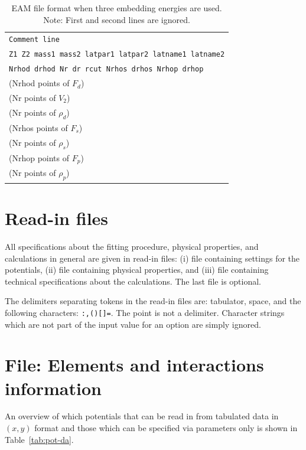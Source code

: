 \documentclass[a4paper,12pt,pdftex,onecolumn]{article}
\begin{document}
\begin{table}[!h]
\caption{
EAM file format when three embedding energies are used.
Note: First and second lines are ignored.
\label{tab:kw-eam-ff3}
}
\begin{center}
\begin{tabular}{|l|}
\hline
\hline
\verb+Comment line+ \\
\verb+Z1 Z2 mass1 mass2 latpar1 latpar2 latname1 latname2+ \\
\verb+Nrhod drhod Nr dr rcut Nrhos drhos Nrhop drhop+ \\
(Nrhod points of $F_d$) \\
(Nr points of $V_2$) \\
(Nr points of $\rho_d$) \\
(Nrhos points of $F_s$) \\
(Nr points of $\rho_s$) \\
(Nrhop points of $F_p$) \\
(Nr points of $\rho_p$) \\
\hline
\hline
\end{tabular}
\end{center}
\end{table}








\section{Read-in files}


All specifications about the fitting procedure, physical properties,
and calculations in general are given in read-in files:
(i) file containing settings for the potentials,
(ii) file containing physical properties, and
(iii) file containing technical specifications about the
calculations. The last file is optional.

The delimiters separating tokens in the read-in files are:
tabulator, space, and the following characters: \verb+:,()[]=+. The
point is not a delimiter. Character strings which are not part of the
input value for an option are simply ignored.





\section{File: Elements and interactions information}


An overview of which potentials that can be read in from tabulated data
in $(x, y)$ format and those which can be specified via parameters only
is shown in Table~\ref{tab:pot-da}.
\end{document}
